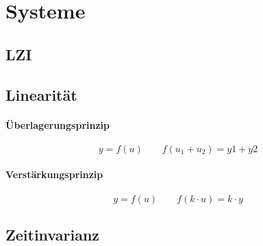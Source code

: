 



\chapter{Systeme}

\section{LZI}

\section{Linearität}

\subsubsection{Überlagerungsprinzip}
\[
    y = f(u) \qquad f(u_1 + u_2) = y1 + y2
\]

\subsubsection{Verstärkungsprinzip}
\[
    y = f(u) \qquad f(k \cdot u) = k \cdot y
\]

\section{Zeitinvarianz}

